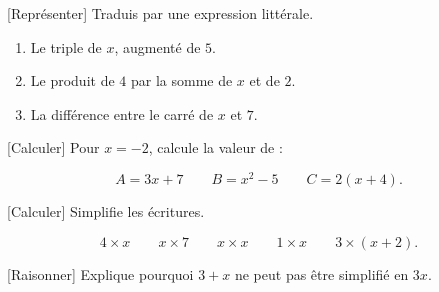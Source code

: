 \documentclass[12pt,a4paper]{article}
\begin{document}

[Représenter]
Traduis par une expression littérale. 

\begin{enumerate}[label=\alph*)]
  \item Le triple de \(x\), augmenté de \(5\).
  \item Le produit de \(4\) par la somme de \(x\) et de \(2\).
  \item La différence entre le carré de \(x\) et \(7\).
\end{enumerate}


[Calculer]
Pour \(x=-2\), calcule la valeur de : 

\[
A=3x+7
\qquad
B=x^2-5
\qquad
C=2(x+4).
\]


[Calculer]
Simplifie les écritures. 

\[
4\times x
\qquad
x\times7
\qquad
x\times x
\qquad
1\times x
\qquad
3\times(x+2).
\]


[Raisonner]
Explique pourquoi \(3+x\) ne peut pas être simplifié en \(3x\). 

\end{document}
